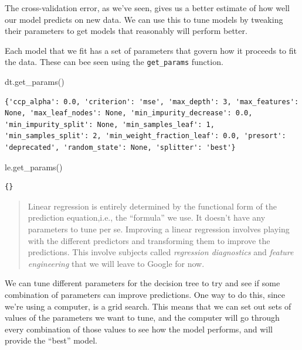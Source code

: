 \documentclass[
  letterpaper,
]{scrbook}
\newenvironment{Shaded}{\begin{snugshade}}{\end{snugshade}}
\newcommand{\NormalTok}[1]{#1}
\begin{document}
The cross-validation error, as we've seen, gives us a better estimate of
how well our model predicts on new data. We can use this to tune models by tweaking their parameters to get models that reasonably will perform better.

Each model that we fit has a set of parameters that govern how it proceeds
to fit the data. These can bee seen using the \texttt{get\_params} function.

\begin{Shaded}
\begin{Highlighting}[]
\NormalTok{dt.get_params()}
\end{Highlighting}
\end{Shaded}

\begin{verbatim}
{'ccp_alpha': 0.0, 'criterion': 'mse', 'max_depth': 3, 'max_features': None, 'max_leaf_nodes': None, 'min_impurity_decrease': 0.0, 'min_impurity_split': None, 'min_samples_leaf': 1, 'min_samples_split': 2, 'min_weight_fraction_leaf': 0.0, 'presort': 'deprecated', 'random_state': None, 'splitter': 'best'}
\end{verbatim}

\begin{Shaded}
\begin{Highlighting}[]
\NormalTok{le.get_params()}
\end{Highlighting}
\end{Shaded}

\begin{verbatim}
{}
\end{verbatim}

\begin{quote}
Linear regression is entirely determined by the functional form of
the prediction equation,i.e., the ``formula'' we use. It doesn't have any parameters to tune per se. Improving a linear regression involves playing
with the different predictors and transforming them to improve the predictions. This involve subjects called \emph{regression diagnostics} and
\emph{feature engineering} that we will leave to Google for now.
\end{quote}

We can tune different parameters for the decision tree to try and see if
some combination of parameters can improve predictions. One way to do this,
since we're using a computer, is a grid search. This means that we can set out sets of values of the parameters we want to tune, and the computer will go through every combination of those values to see how the model
performs, and will provide the ``best'' model.
\end{document}
